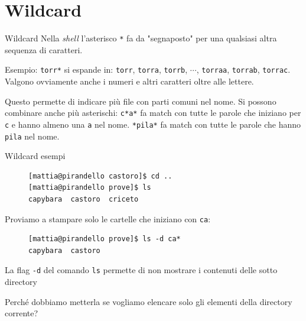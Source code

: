 \section{Wildcard}
\begin{frame}{Wildcard}
  Nella \textit{shell} l'asterisco \texttt{*} fa da "segnaposto" per una 
  qualsiasi altra sequenza di caratteri.\bigskip

  Esempio: \texttt{torr*} si espande in: \texttt{torr}, \texttt{torra}, 
  \texttt{torrb}, $\cdots$, \texttt{torraa}, \texttt{torrab}, \texttt{torrac}. 
  Valgono ovviamente anche i numeri e altri caratteri oltre alle lettere.\bigskip

  Questo permette di indicare più file con parti comuni nel nome. Si possono
  combinare anche più asterischi: \texttt{c*a*} fa match con tutte le
  parole che iniziano per \texttt{c} e hanno almeno una \texttt{a} nel 
  nome. \texttt{*pila*} fa match con tutte le parole che hanno \texttt{pila} nel 
  nome.\bigskip
\end{frame}

\begin{frame}[fragile]{Wildcard esempi}
  \begin{figure}
    \begin{lstlisting}[basicstyle=\footnotesize]
[mattia@pirandello castoro]$ cd ..
[mattia@pirandello prove]$ ls
capybara  castoro  criceto
    \end{lstlisting}
  \end{figure}

  Proviamo a stampare solo le cartelle che iniziano con \texttt{ca}: 
  
  \begin{figure}
    \begin{lstlisting}[basicstyle=\footnotesize]
[mattia@pirandello prove]$ ls -d ca*
capybara  castoro
    \end{lstlisting}
  \end{figure}

  La flag \texttt{-d} del comando \texttt{ls} permette di non mostrare i contenuti delle
  sotto  directory \bigskip

  Perché dobbiamo metterla se vogliamo elencare solo gli elementi della directory corrente?

\end{frame}

